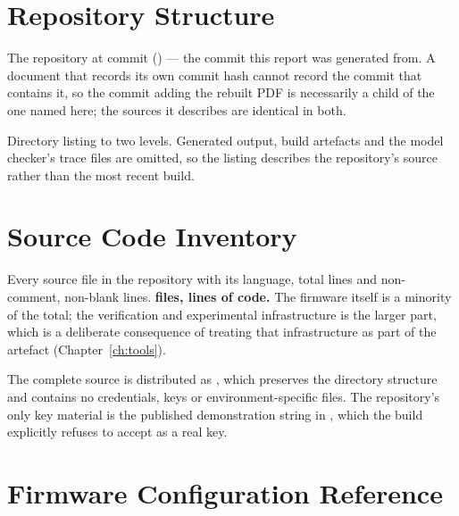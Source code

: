 
\chapter{Repository Structure}\label{app:tree}

The repository at commit \repohead{} (\repohashfull) --- the commit this report was generated
from. A document that records its own commit hash cannot record the commit that contains it, so
the commit adding the rebuilt PDF is necessarily a child of the one named here; the sources it
describes are identical in both.

Directory listing to two levels. Generated output, build artefacts and the model checker's trace
files are omitted, so the listing describes the repository's source rather than the most recent
build.



\chapter{Source Code Inventory}\label{app:inventory}

Every source file in the repository with its language, total lines and non-comment,
non-blank lines. \textbf{\srcfiles{} files, \srccode{} lines of code.} The firmware itself is a
minority of the total; the verification and experimental infrastructure is the larger part, which
is a deliberate consequence of treating that infrastructure as part of the artefact
(Chapter~\ref{ch:tools}).

The complete source is distributed as
, which
preserves the directory structure and contains no credentials, keys or environment-specific
files. The repository's only key material is the published demonstration string in
, which the build explicitly refuses to accept as a real key.



\chapter{Firmware Configuration Reference}\label{app:config}

